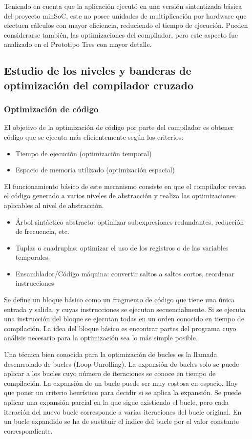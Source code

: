 		Teniendo en cuenta que la aplicación ejecutó en una versión sintentizada básica del proyecto minSoC, este no posee unidades de multiplicación
		por hardware que efectuen cálculos con mayor eficiencia, reduciendo el tiempo de ejecución. Pueden considerarse también, las optimizaciones del
		compilador, pero este aspecto fue analizado en el Prototipo Tres con mayor detalle. 	

        \subsection{Estudio de los niveles y banderas de optimización del compilador cruzado}
		\subsubsection{Optimización de código}
		
El objetivo de la optimización de código por parte del compilador es obtener código que se ejecuta más eficientemente según los criterios:
\begin{itemize}
  \item Tiempo de ejecución (optimización temporal)
  \item Espacio de memoria utilizado (optimización espacial) 
\end{itemize}
 
El funcionamiento básico de este mecanismo consiste en que el compilador revisa el código generado a varios niveles de abstracción y realiza las
optimizaciones aplicables al nivel de abstracción.
\begin{itemize}
  	\item Árbol sintáctico abstracto: optimizar subexpresiones redundantes, reducción de frecuencia, etc.
	\item Tuplas o cuadruplas: optimizar el uso de los registros o de las variables temporales.
	\item Ensamblador/Código máquina: convertir saltos a saltos cortos, reordenar instrucciones
\end{itemize}

Se define un bloque básico como un fragmento de código que tiene una única entrada y salida, y cuyas instrucciones se ejecutan secuencialmente. Si se
ejecuta una instrucción del bloque se ejecutan todas en un orden conocido en tiempo de compilación. La idea del bloque básico es encontrar partes del programa
cuyo análisis necesario para la optimización sea lo más simple posible.

Una técnica bien conocida para la optimización de bucles es la llamada desenrrolado de bucles (Loop Unrolling). La expansión de bucles solo se puede
aplicar a los bucles cuyo número de iteraciones se conoce en tiempo de compilación. La expansión de un bucle puede ser muy costosa en espacio. Hay
que poner un criterio heurístico para decidir si se aplica la expansión. Se puede aplicar una expansión parcial en la que sigue existiendo el bucle,
pero cada iteración del nuevo bucle corresponde a varias iteraciones del bucle original. En un bucle expandido se ha de sustituir el índice del bucle 
por el valor constante correspondiente.

